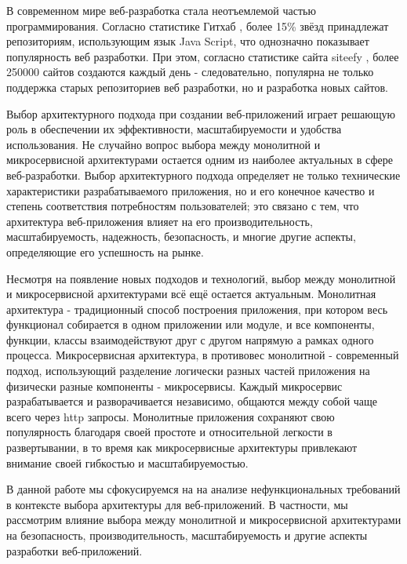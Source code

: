     В современном мире веб-разработка стала неотъемлемой частью программирования. Согласно статистике Гитхаб \cite{githut}, более 15\% звёзд принадлежат репозиториям, использующим язык Java Script, что однозначно показывает популярность веб разработки. При этом, согласно статистике сайта siteefy \cite{websitesstats}, более 250000 сайтов создаются каждый день - следовательно, популярна не только поддержка старых репозиториев веб разработки, но и разработка новых сайтов.
    
    Выбор архитектурного подхода при создании веб-приложений играет решающую роль в обеспечении их эффективности, масштабируемости и удобства использования. Не случайно вопрос выбора между монолитной и микросервисной архитектурами остается одним из наиболее актуальных в сфере веб-разработки. Выбор архитектурного подхода определяет не только технические характеристики разрабатываемого приложения, но и его конечное качество и степень соответствия потребностям пользователей; это связано с тем, что архитектура веб-приложения влияет на его производительность, масштабируемость, надежность, безопасность, и многие другие аспекты, определяющие его успешность на рынке.
    
    Несмотря на появление новых подходов и технологий, выбор между монолитной и микросервисной архитектурами всё ещё остается актуальным. Монолитная архитектура - традиционный способ построения приложения, при котором весь функционал собирается в одном приложении или модуле, и все компоненты, функции, классы взаимодействуют друг с другом напрямую а рамках одного процесса. Микросервисная архитектура, в противовес монолитной - современный подход, использующий разделение логически разных частей приложения на физически разные компоненты - микросервисы. Каждый микросервис разрабатывается и разворачивается независимо, общаются между собой чаще всего через http запросы. Монолитные приложения сохраняют свою популярность благодаря своей простоте и относительной легкости в развертывании, в то время как микросервисные архитектуры привлекают внимание своей гибкостью и масштабируемостью.
    
    В данной работе мы сфокусируемся на  на анализе нефункциональных требований в контексте выбора архитектуры для веб-приложений. В частности, мы рассмотрим влияние выбора между монолитной и микросервисной архитектурами на безопасность, производительность, масштабируемость и другие аспекты разработки веб-приложений.

\clearpage
